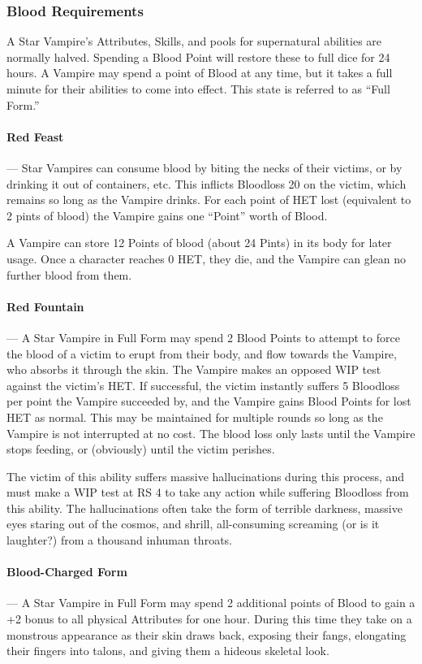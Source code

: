 \documentclass[oneside,11pt,english]{book}
\begin{document}
\subsubsection{Blood Requirements}
A Star Vampire's Attributes, Skills, and pools for supernatural abilities are normally halved. 
Spending a Blood Point will restore these to full dice for 24 hours. A Vampire may spend a point 
of Blood at any time, but it takes a full minute for their abilities to come into effect. This state is 
referred to as “Full Form.”

\paragraph{Red Feast}---\quad
Star Vampires can consume blood by biting the necks of their victims, or by drinking it out of 
containers, etc. This inflicts Bloodloss 20 on the victim, which remains so long as the Vampire 
drinks. For each point of HET lost (equivalent to 2 pints of blood) the Vampire gains one “Point” 
worth of Blood.

A Vampire can store 12 Points of blood (about 24 Pints) in its body for later 
usage. Once a character reaches 0 HET, they die, and the Vampire can glean no further blood 
from them.

\paragraph{Red Fountain}---\quad
A Star Vampire in Full Form may spend 2 Blood Points to attempt to force the blood of a victim 
to erupt from their body, and flow towards the Vampire, who absorbs it through the skin. The 
Vampire makes an opposed WIP test against the victim’s HET. If successful, the victim instantly 
suffers 5 Bloodloss per point the Vampire succeeded by, and the Vampire gains Blood Points 
for lost HET as normal. This may be maintained for multiple rounds so long as the Vampire is 
not interrupted at no cost. The blood loss only lasts until the Vampire stops feeding, or 
(obviously) until the victim perishes.

The victim of this ability suffers massive hallucinations during this process, and must make a 
WIP test at RS 4 to take any action while suffering Bloodloss from this ability. The hallucinations often take the form of terrible darkness, massive eyes staring out of the cosmos, and shrill,
all-consuming screaming (or is it laughter?) from a thousand inhuman throats. 

\paragraph{Blood-Charged Form}---\quad
A Star Vampire in Full Form may spend 2 additional points of Blood to gain a +2 bonus to all 
physical Attributes for one hour. During this time they take on a monstrous appearance as their 
skin draws back, exposing their fangs, elongating their fingers into talons, and giving them a 
hideous skeletal look. 
\end{document}
